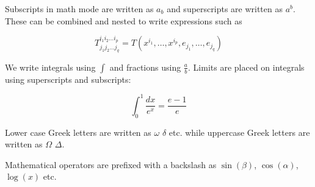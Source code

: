 \documentclass{article}
\begin{document}
	Subscripts in math mode are written as $a_b$ and superscripts are written as $a^b$. These can be combined and nested to write expressions such as
	
	\[T^{i_1 i_2 \dots i_p}_{j_1 j_2 \dots j_q} = T(x^{i_1}, \dots, x^{i_p}, e_{j_1}, \dots, e_{j_q})\]
	
	We write integrals using $\int$ and fractions using $\frac{a}{b}$. Limits are placed on integrals using superscripts and subscripts:
	
	\[\int_{0}^{1} \frac{dx}{e^x} = \frac{e-1}{e}\]
	
	Lower case Greek letters are written as $\omega$ $\delta$ etc. while uppercase Greek letters are written as $\Omega$ $\Delta$.
	
	Mathematical operators are prefixed with a backslash as $\sin(\beta)$, $\cos(\alpha)$, $\log(x)$ etc.
\end{document}
